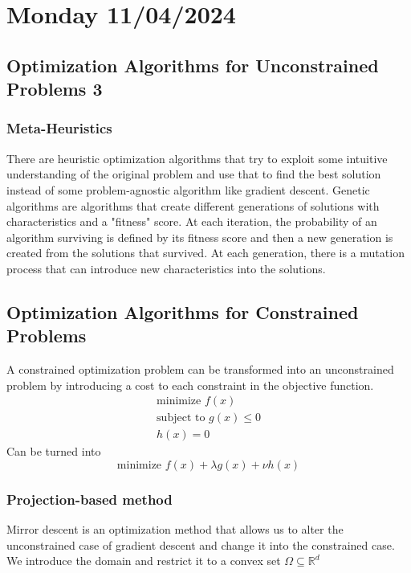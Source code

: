 \section{Monday 11/04/2024}
\subsection{Optimization Algorithms for Unconstrained Problems 3}
\subsubsection{Meta-Heuristics}
There are heuristic optimization algorithms that try to exploit some intuitive understanding of the original problem and use that to find the best solution instead of some problem-agnostic algorithm like gradient descent. Genetic algorithms are algorithms that create different generations of solutions with characteristics and a "fitness" score. At each iteration, the probability of an algorithm surviving is defined by its fitness score and then a new generation is created from the solutions that survived. At each generation, there is a mutation process that can introduce new characteristics into the solutions.
\subsection{Optimization Algorithms for Constrained Problems}
A constrained optimization problem can be transformed into an unconstrained problem by introducing a cost to each constraint in the objective function.
\begin{equation}
  \begin{aligned}
    \text{minimize } f(x) \\
    \text{subject to } g(x) \leq 0 \\
    h(x) = 0
  \end{aligned}
\end{equation}
Can be turned into
\begin{equation}
  \text{minimize } f(x) + \lambda g(x) + \nu h(x)
\end{equation}

\subsubsection{Projection-based method}
Mirror descent is an optimization method that allows us to alter the unconstrained case of gradient descent and change it into the constrained case. We introduce the domain and restrict it to a convex set $\Omega \subseteq \mathbb{R}^d$

